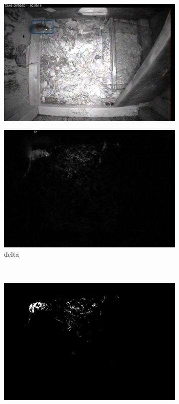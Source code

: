 \documentclass[letter]{article}
\begin{document}
\begin{appendices}
\begin{figure}[h]
  \centering
  \begin{subfigure}[b]{0.4\textwidth}
      \centering
      \includegraphics[width=\textwidth]{tracking.jpg}
      \vspace{5pt}
  \end{subfigure}
  \begin{subfigure}[b]{0.4\textwidth}
      \centering
      \includegraphics[width=\textwidth]{video_delta.jpg}
      \caption{delta}
  \end{subfigure} \\
  \begin{subfigure}[b]{0.4\textwidth}
      \centering
      \includegraphics[width=\textwidth]{video_binthresh.jpg}

\end{subfigure}
\end{figure}
\end{appendices}
\end{document}
